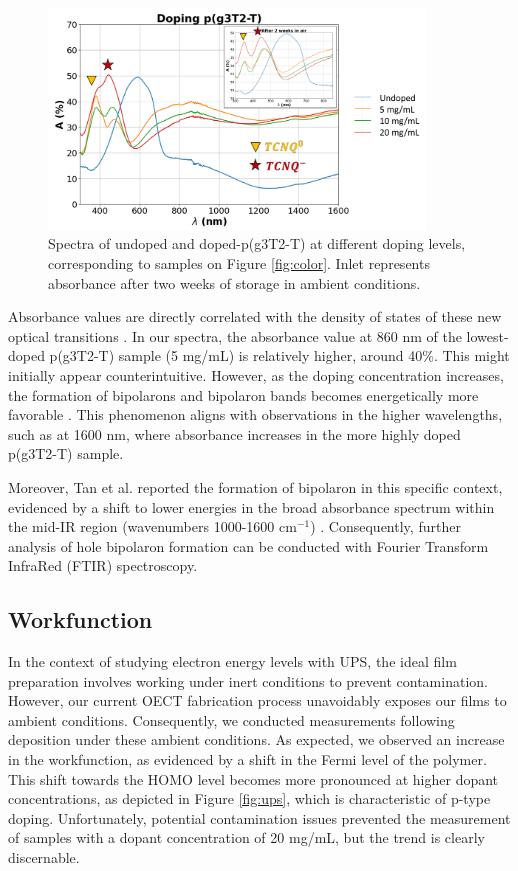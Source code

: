 \begin{figure}[ht]
  \centering
  \includegraphics[width=10cm]{Images/pdf/abs+inlet.pdf}
  \caption[Absorbance spectra of different doping levels of p(g3T2-T)]{Spectra of undoped and doped-p(g3T2-T) at different doping levels, corresponding to samples on Figure \ref{fig:color}. Inlet represents absorbance after two weeks of storage in ambient conditions.}
  \label{fig:abs}
\end{figure}

Absorbance values are directly correlated with the density of states of these new optical transitions \cite{bredasPolaronsBipolaronsSolitons1985}. In our spectra, the absorbance value at 860 nm of the lowest-doped p(g3T2-T) sample (5 mg/mL) is relatively higher, around 40\%. This might initially appear counterintuitive. However, as the doping concentration increases, the formation of bipolarons and bipolaron bands becomes energetically more favorable \cite{enenglDopinginducedAbsorptionBands2016} . This phenomenon aligns with observations in the higher wavelengths, such as at 1600 nm, where absorbance increases in the more highly doped p(g3T2-T) sample.

Moreover, Tan et al. reported the formation of bipolaron in this specific context, evidenced by a shift to lower energies in the broad absorbance spectrum within the mid-IR region (wavenumbers 1000-1600 cm$^{-1}$) \cite{tanTuningOrganicElectrochemical2022}. Consequently, further analysis of hole bipolaron formation can be conducted with Fourier Transform InfraRed (FTIR) spectroscopy.
 
\subsection{Workfunction}

In the context of studying electron energy levels with UPS, the ideal film preparation involves working under inert conditions to prevent contamination. However, our current OECT fabrication process unavoidably exposes our films to ambient conditions. Consequently, we conducted measurements following deposition under these ambient conditions. As expected, we observed an increase in the workfunction, as evidenced by a shift in the Fermi level of the polymer. This shift towards the HOMO level becomes more pronounced at higher dopant concentrations, as depicted in Figure \ref{fig:ups}, which is characteristic of p-type doping. Unfortunately, potential contamination issues prevented the measurement of samples with a dopant concentration of 20 mg/mL, but the trend is clearly discernable.

